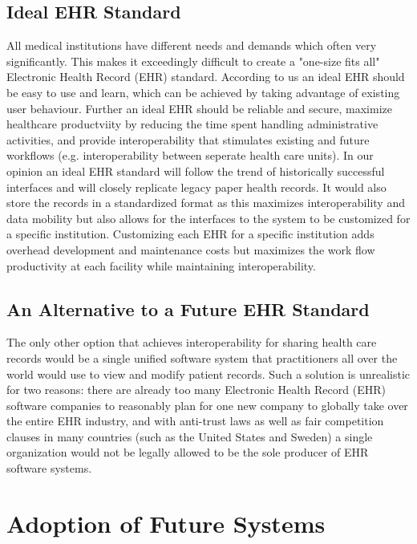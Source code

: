 \documentclass[14pt]{article}
\begin{document}
\subsection{Ideal EHR Standard}
All medical institutions have different needs and demands which often very significantly. This makes it exceedingly difficult to create a "one-size fits all" Electronic Health Record (\gls{EHR}) standard. According to us an ideal \gls{EHR} should be easy to use and learn, which can be achieved by taking advantage of existing user behaviour. Further an ideal \gls{EHR} should be reliable and secure, maximize healthcare productviity by reducing the time spent handling administrative activities, and provide interoperability that stimulates existing and future workflows (e.g. interoperability between seperate health care units). In our opinion an ideal \gls{EHR} standard will follow the trend of historically successful interfaces and will closely replicate legacy paper health records. It would also store the records in a standardized format as this maximizes interoperability and data mobility but also allows for the interfaces to the system to be customized for a specific institution. Customizing each \gls{EHR} for a specific institution adds overhead development and maintenance costs but maximizes the work flow productivity at each facility while maintaining interoperability. 

\subsection{An Alternative to a Future EHR Standard}
\label{sec:TechnicalStandardsAlternative}
The only other option that achieves interoperability for sharing health care records would be a single unified software system that practitioners all over the world would use to view and modify patient records. Such a solution is unrealistic for two reasons: there are already too many Electronic Health Record (\gls{EHR}) software companies to reasonably plan for one new company to globally take over the entire \gls{EHR} industry, and with anti-trust laws as well as fair competition clauses in many countries (such as the United States and Sweden) a single organization would not be legally allowed to be the sole producer of \gls{EHR} software systems.

\newpage

\section{Adoption of Future Systems}
\label{sec:Future}
\end{document}
